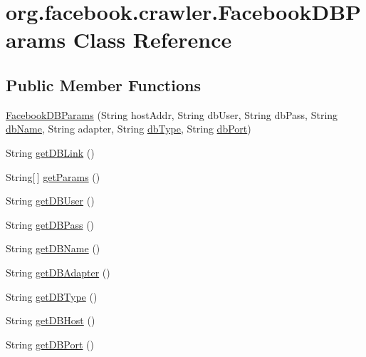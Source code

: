 \hypertarget{classorg_1_1facebook_1_1crawler_1_1_facebook_d_b_params}{\section{org.\-facebook.\-crawler.\-Facebook\-D\-B\-Params Class Reference}
\label{classorg_1_1facebook_1_1crawler_1_1_facebook_d_b_params}
}
\subsection*{Public Member Functions}
\begin{DoxyCompactItemize}
\item 
\hyperlink{classorg_1_1facebook_1_1crawler_1_1_facebook_d_b_params_a084cd62afa43d69742369d0f3c53762b}{Facebook\-D\-B\-Params} (String host\-Addr, String db\-User, String db\-Pass, String \hyperlink{classorg_1_1facebook_1_1crawler_1_1_facebook_d_b_params_a7f77783a820785d9c6b19bd5c3072d94}{db\-Name}, String adapter, String \hyperlink{classorg_1_1facebook_1_1crawler_1_1_facebook_d_b_params_a080ce06d866679ccd36d9a3d445323e2}{db\-Type}, String \hyperlink{classorg_1_1facebook_1_1crawler_1_1_facebook_d_b_params_ad96c828b8283b58569f4560dacb0145d}{db\-Port})
\item 
String \hyperlink{classorg_1_1facebook_1_1crawler_1_1_facebook_d_b_params_af147a42d3fe3420446bb3398ecf83c07}{get\-D\-B\-Link} ()
\item 
String\mbox{[}$\,$\mbox{]} \hyperlink{classorg_1_1facebook_1_1crawler_1_1_facebook_d_b_params_a2c1b3b30fa4874d036f1aafb13c8ce40}{get\-Params} ()
\item 
String \hyperlink{classorg_1_1facebook_1_1crawler_1_1_facebook_d_b_params_a97d1092a497da86a58c73c3d3f935e4a}{get\-D\-B\-User} ()
\item 
String \hyperlink{classorg_1_1facebook_1_1crawler_1_1_facebook_d_b_params_a4fd5cc4ce5efee2b65b6b09333dc660f}{get\-D\-B\-Pass} ()
\item 
String \hyperlink{classorg_1_1facebook_1_1crawler_1_1_facebook_d_b_params_a2aa4bb4e8d47d5a22ecb318897f89f93}{get\-D\-B\-Name} ()
\item 
String \hyperlink{classorg_1_1facebook_1_1crawler_1_1_facebook_d_b_params_aad967253677aa801a8600ae267318500}{get\-D\-B\-Adapter} ()
\item 
String \hyperlink{classorg_1_1facebook_1_1crawler_1_1_facebook_d_b_params_aa4a8e39aae2983b13967e0f027cfe877}{get\-D\-B\-Type} ()
\item 
String \hyperlink{classorg_1_1facebook_1_1crawler_1_1_facebook_d_b_params_a3ba206141d42eb6ade80d463d2168099}{get\-D\-B\-Host} ()
\item 
String \hyperlink{classorg_1_1facebook_1_1crawler_1_1_facebook_d_b_params_abb26238a8abe459de005d12017385182}{get\-D\-B\-Port} ()
\end{DoxyCompactItemize}
